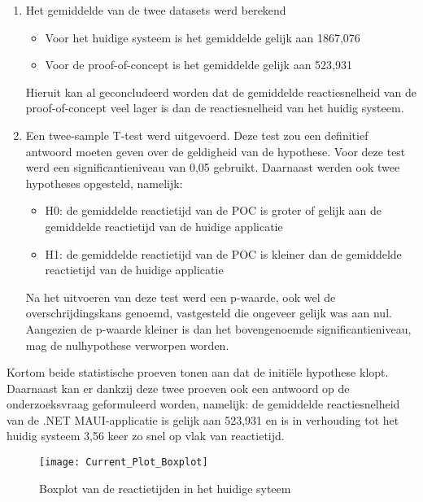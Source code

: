 \begin{enumerate}
    \item Het gemiddelde van de twee datasets werd berekend
    
    \begin{itemize}
        \item Voor het huidige systeem is het gemiddelde gelijk aan 1867,076
        
        \item Voor de proof-of-concept is het gemiddelde gelijk aan 523,931
    \end{itemize}

    Hieruit kan al geconcludeerd worden dat de gemiddelde reactiesnelheid van de proof-of-concept veel lager is dan de reactiesnelheid van het huidig systeem.

    \item Een twee-sample T-test werd uitgevoerd. Deze test zou een definitief antwoord moeten geven over de geldigheid van de hypothese. Voor deze test werd een significantieniveau van 0,05 gebruikt. Daarnaast werden ook twee hypotheses opgesteld, namelijk:
    
    \begin{itemize}
        \item H0: de gemiddelde reactietijd van de POC is groter of gelijk aan de gemiddelde reactietijd van de huidige applicatie
        
        \item H1: de gemiddelde reactietijd van de POC is kleiner dan de gemiddelde reactietijd van de huidige applicatie
    \end{itemize}

    Na het uitvoeren van deze test werd een p-waarde, ook wel de overschrijdingskans genoemd, vastgesteld die ongeveer gelijk was aan nul. Aangezien de p-waarde kleiner is dan het bovengenoemde significantieniveau, mag de nulhypothese verworpen worden.
\end{enumerate}

Kortom beide statistische proeven tonen aan dat de initiële hypothese klopt. Daarnaast kan er dankzij deze twee proeven ook een antwoord op de onderzoeksvraag geformuleerd worden, namelijk: de gemiddelde reactiesnelheid van de .NET MAUI-applicatie is gelijk aan 523,931 en is in verhouding tot het huidig systeem 3,56 keer zo snel op vlak van reactietijd.

\begin{figure}[H]
    \texttt{[image: Current\_Plot\_Boxplot]}
    \centering
    \caption{Boxplot van de reactietijden in het huidige syteem}
    \label{fig:httpLongPolling}
\end{figure}

